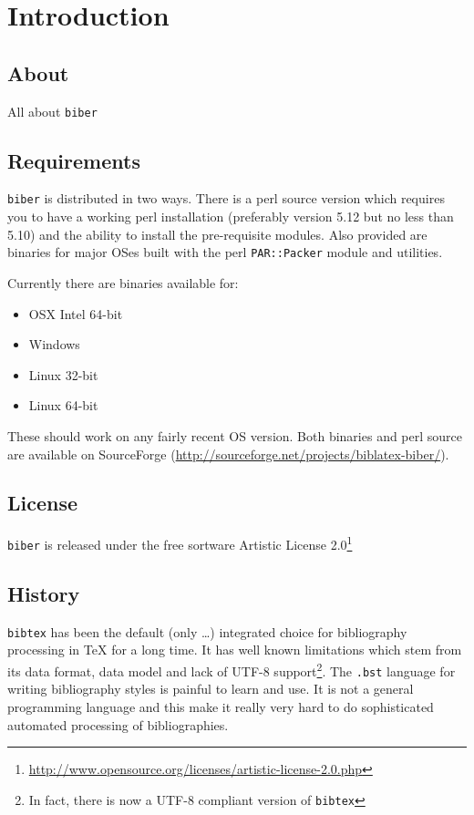 \documentclass{ltxdockit}
\begin{document}
\printtitlepage
\tableofcontents

\section{Introduction}
\label{int}

\subsection{About}

All about \verb+biber+

\subsection{Requirements}\label{ref:req}

\verb+biber+ is distributed in two ways. There is a perl source
version which requires you to have a working perl installation
(preferably version 5.12 but no less than 5.10) and the ability to
install the pre-requisite modules. Also provided are binaries for
major OSes built with the perl \verb+PAR::Packer+ module and utilities.

Currently there are binaries available for:

\begin{itemize}
\item OSX Intel 64-bit
\item Windows
\item Linux 32-bit
\item Linux 64-bit
\end{itemize}

These should work on any fairly recent OS version. Both binaries and
perl source are available on SourceForge (\url{http://sourceforge.net/projects/biblatex-biber/}).

\subsection{License}

\verb+biber+ is released under the free sortware Artistic License 2.0\footnote{\url{http://www.opensource.org/licenses/artistic-license-2.0.php}}

\subsection{History}

\verb+bibtex+ has been the default (only \ldots) integrated choice for
bibliography processing in TeX for a long time. It has well known
limitations which stem from its data format, data model and lack of
UTF-8 support\footnote{In fact, there is now a UTF-8 compliant version
of \verb+bibtex+}. The \verb+.bst+ language for writing bibliography
styles is painful to learn and use. It is not a general programming
language and this make it really very hard to do sophisticated
automated processing of bibliographies.
\end{document}
